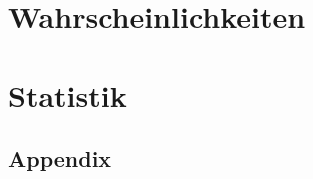 \documentclass[8pt]{article}
\begin{document}
\begin{multicols*}{4}
    \raggedright
    
    \clearpage
    \part{Wahrscheinlichkeiten}
    
    
    
    
    \clearpage
    \part{Statistik}
    
    
    
    
\end{multicols*}
\begin{multicols*}{3}
    \part{Appendix}
    
\end{multicols*}
\end{document}
